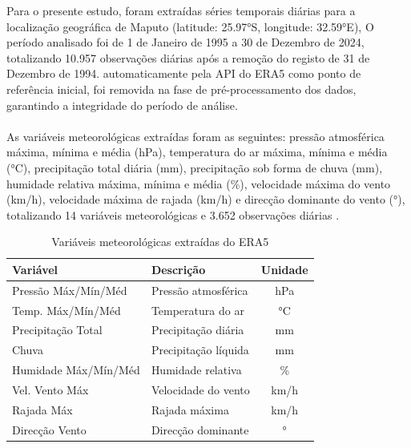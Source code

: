 \documentclass[9pt,twocolumn,twoside,english,portuguese]{opticajnl}
\begin{document}
Para o presente estudo, foram extraídas séries temporais diárias para a localização geográfica de Maputo (latitude: 25.97°S, longitude: 32.59°E), O período analisado foi de 1 de Janeiro de 1995 a 30 de Dezembro de 2024, totalizando 10.957 observações diárias após a remoção do registo de
31 de Dezembro de 1994. automaticamente pela API do ERA5 como ponto de referência inicial, foi removida na fase de pré-processamento dos dados, garantindo a integridade do período de análise.
\paragraph{}
As variáveis meteorológicas extraídas foram as seguintes: pressão atmosférica máxima, mínima e média (hPa), temperatura do ar máxima, mínima e média (°C), 
precipitação total diária (mm), precipitação sob forma de chuva (mm), humidade relativa máxima, mínima e média (\%), velocidade máxima do vento (km/h), velocidade máxima de rajada (km/h) e direcção dominante do vento (°), totalizando 14 variáveis meteorológicas e 3.652 observações diárias \cite{hersbach2020}.

\begin{table}[H]
\centering
\caption{Variáveis meteorológicas extraídas do ERA5}
\begin{tabular}{llc}
\hline
\textbf{Variável} & \textbf{Descrição} & \textbf{Unidade} \\
\hline
Pressão Máx/Mín/Méd & Pressão atmosférica & hPa \\
Temp. Máx/Mín/Méd   & Temperatura do ar   & °C  \\
Precipitação Total  & Precipitação diária & mm  \\
Chuva               & Precipitação líquida & mm \\
Humidade Máx/Mín/Méd & Humidade relativa  & \% \\
Vel. Vento Máx      & Velocidade do vento & km/h \\
Rajada Máx          & Rajada máxima       & km/h \\
Direcção Vento      & Direcção dominante  & °   \\
\hline
\end{tabular}
\label{tab:variaveis}
\end{table}
\end{document}
